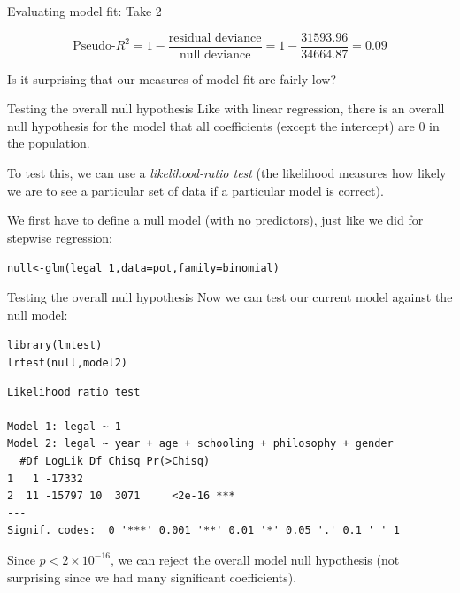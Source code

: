 \documentclass{beamer}\usepackage[]{graphicx}\usepackage[]{color}
\makeatletter
\newcommand{\hlnum}[1]{\textcolor[rgb]{0.824,0.412,0.118}{#1}}%
\newcommand{\hlopt}[1]{\textcolor[rgb]{1,0.894,0.769}{#1}}%
\newcommand{\hlstd}[1]{\textcolor[rgb]{1,0.894,0.769}{#1}}%
\newcommand{\hlkwb}[1]{\textcolor[rgb]{0.804,0.776,0.451}{#1}}%
\newcommand{\hlkwc}[1]{\textcolor[rgb]{0.78,0.941,0.545}{#1}}%
\newcommand{\hlkwd}[1]{\textcolor[rgb]{1,0.78,0.769}{#1}}%
\newenvironment{kframe}{%
 \def\at@end@of@kframe{}%
 \ifinner\ifhmode%
  \def\at@end@of@kframe{\end{minipage}}%
  \begin{minipage}{\columnwidth}%
 \fi\fi%
 \def\FrameCommand##1{\hskip\@totalleftmargin \hskip-\fboxsep
 \colorbox{shadecolor}{##1}\hskip-\fboxsep
     \hskip-\linewidth \hskip-\@totalleftmargin \hskip\columnwidth}%
 \MakeFramed {\advance\hsize-\width
   \@totalleftmargin\z@ \linewidth\hsize
   \@setminipage}}%
 {\par\unskip\endMakeFramed%
 \at@end@of@kframe}
\newenvironment{knitrout}{}{} %
\makeatother
\begin{document}
\begin{darkframes}
    \begin{frame}{Evaluating model fit: Take 2}
      
      \[
        \text{Pseudo-}R^2 = 1 - \frac{\text{residual deviance}}{\text{null deviance}} = 
        1 - \frac{31593.96}{34664.87} = 0.09
      \]

      \pause\bigskip

      \fontsize{11}{11}\selectfont
      Is it surprising that our measures of model fit are fairly low?
    \end{frame}

    \begin{frame}[fragile]{Testing the overall null hypothesis}
      Like with linear regression, there is an overall null hypothesis for the model that all coefficients (except the intercept) are 0 in the population.

      \bigskip\pause

      To test this, we can use a \emph{likelihood-ratio test} (the likelihood measures how likely we are to see a particular set of data if a particular model is correct).

      \bigskip\pause

      We first have to define a null model (with no predictors), just like we did for stepwise regression:
\begin{knitrout}
\begin{kframe}
\begin{alltt}
\hlstd{null} \hlkwb{<-} \hlkwd{glm}\hlstd{(legal} \hlopt{~} \hlnum{1}\hlstd{,} \hlkwc{data}\hlstd{=pot,} \hlkwc{family}\hlstd{=binomial)}
\end{alltt}
\end{kframe}
\end{knitrout}
    \end{frame}

    \begin{frame}[fragile]{Testing the overall null hypothesis}
      Now we can test our current model against the null model: 
      \fontsize{9}{9}\selectfont
\begin{knitrout}
\begin{kframe}
\begin{alltt}
\hlkwd{library}\hlstd{(lmtest)}
\hlkwd{lrtest}\hlstd{(null, model2)}
\end{alltt}
\begin{verbatim}
Likelihood ratio test

Model 1: legal ~ 1
Model 2: legal ~ year + age + schooling + philosophy + gender
  #Df LogLik Df Chisq Pr(>Chisq)    
1   1 -17332                        
2  11 -15797 10  3071     <2e-16 ***
---
Signif. codes:  0 '***' 0.001 '**' 0.01 '*' 0.05 '.' 0.1 ' ' 1
\end{verbatim}
\end{kframe}
\end{knitrout}
      \fontsize{11}{11}\selectfont
      \pause
      Since $p< 2\times 10^{-16}$, we can reject the overall model null hypothesis (not surprising since we had many significant coefficients).
    \end{frame}
  \end{darkframes}
\end{document}
